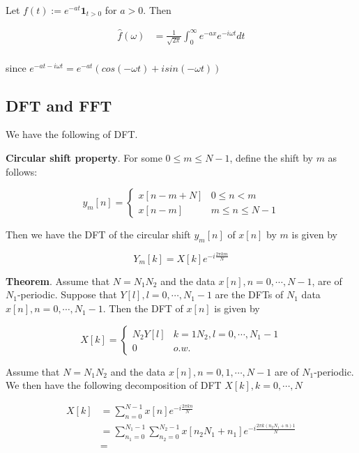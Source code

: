 \documentclass[12pt]{article}
\theoremstyle{nonumberbreak}
\begin{document}
Let $f(t) := e^{-at} \mathbf{1}_{t>0}$ for $a >0$. Then

$$
\begin{aligned}
\hat{f}(\omega) &= \frac{1}{\sqrt{2\pi}} \int_0^\infty e^{-ax} e^{-i \omega t} dt \\[8pt]
\end{aligned}
$$

since $e^{-at - i\omega t} = e^{-at} \left( cos(-\omega t) + i sin( - \omega t) \right) $ 



\subsection*{DFT and FFT}


We have the following  of DFT. 



\begin{theorem}
\textbf{Circular shift property}. For some $0 \le m \le N-1$, define the shift by $m$ as follows:

$$
y_m[n] = \begin{cases} 
x[n-m+N] & 0 \le n < m \\
x[n-m] & m \le n \le N-1
\end{cases}
$$

Then we have the DFT of the circular shift $y_m[n]$ of $x[n]$ by $m$ is given by

$$
Y_m[k] = X[k] e^{-i \frac{2\pi km}{N}}
$$
\end{theorem}




\begin{theorem}
\textbf{Theorem}. Assume that $N=N_1N_2$ and the data $x[n], n=0,\cdots,N-1$, are of $N_1$-periodic. Suppose that $Y[l], l=0,\cdots,N_1-1$ are the DFTs of $N_1$ data $x[n], n=0,\cdots,N_1-1$. Then the DFT of $x[n]$ is given by

$$
X[k] = \begin{cases} 
N_2 Y[l] & k=1N_2, l=0,\cdots,N_1-1 \\
0 & o.w.
\end{cases}
$$
\end{theorem}


Assume that $N=N_1N_2$ and the data $x[n], n=0,1,\cdots,N-1$ are of $N_1$-periodic. We then have the following decomposition of DFT $X[k], k=0,\cdots,N$

$$
\begin{aligned}
X[k] &= \sum_{n=0}^{N-1} x[n] e^{-i\frac{2\pi kn}{N}} \\[8pt]
&= \sum_{n_1=0}^{N_1-1} \sum_{n_2=0}^{N_2-1} x[n_2 N_1 + n_1] e^{-i \frac{2\pi k (n_2 N_1 + n)1 }{N}} \\[8pt]
&= 
\end{aligned}
$$
\end{document}
